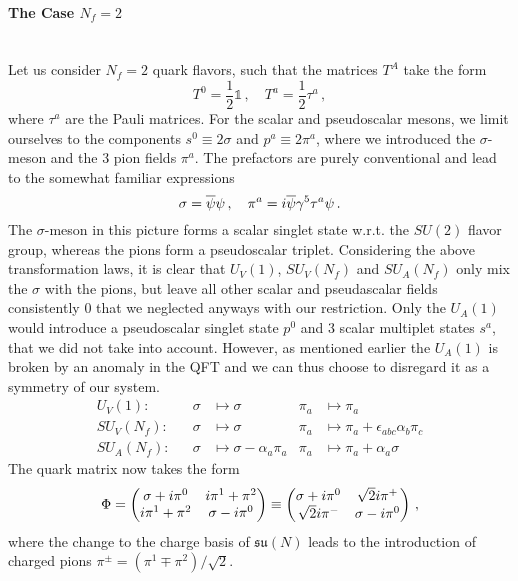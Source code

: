 \paragraph{The Case $N_f=2$}\mbox{}\\

Let us consider $N_f=2$ quark flavors, such that the matrices $T^A$ take the form
\begin{equation}
    T^0=\frac{1}{2}\mathbb{1}\,,\quad T^a=\frac{1}{2}\tau^a\,,
\end{equation}
where $\tau^a$ are the Pauli matrices. For the scalar and pseudoscalar mesons, we limit ourselves to the components $s^0\equiv 2\sigma$ and $p^a\equiv 2\pi^a$, where we introduced the $\sigma$-meson and the 3 pion fields $\pi^a$. The prefactors are purely conventional and lead to the somewhat familiar expressions
\begin{equation}
    \sigma=\overline{\psi}\psi\,,\quad \pi^a={i}\overline{\psi}\gamma^5\tau^a\psi\,.
\end{equation}
The $\sigma$-meson in this picture forms a scalar singlet state w.r.t. the $SU(2)$ flavor group, whereas the pions form a pseudoscalar triplet. Considering the above transformation laws, it is clear that $U_V(1)$, $SU_V(N_f)$ and $SU_A(N_f)$ only mix the $\sigma$ with the pions, but leave all other scalar and pseudascalar fields consistently $0$ that we neglected anyways with our restriction. Only the $U_A(1)$ would introduce a pseudoscalar singlet state $p^0$ and 3 scalar multiplet states $s^a$, that we did not take into account. However, as mentioned earlier the $U_A(1)$ is broken by an anomaly in the QFT and we can thus choose to disregard it as a symmetry of our system.
\begin{subequations}
    \begin{align}
        &  & U_V(1): &  & \sigma & \mapsto\sigma               & \pi_a            & \mapsto\pi_a & & \\
        &  & SU_V(N_f): &  & \sigma & \mapsto\sigma               & \pi_a            & \mapsto\pi_a+\epsilon_{abc}\alpha_b\pi_c                                                    & & \\
        &  & SU_A(N_f): &  & \sigma & \mapsto\sigma-\alpha_a\pi_a & \pi_a            & \mapsto\pi_a+\alpha_a\sigma                                                                 & & 
    \end{align}
\end{subequations}
The quark matrix now takes the form
\begin{equation}
    \Phi=\begin{pmatrix}
        \sigma+{i}\pi^0&{i}\pi^1+\pi^2\\
        {i}\pi^1+\pi^2&\sigma-{i}\pi^0
    \end{pmatrix}\equiv
    \begin{pmatrix}
        \sigma+{i}\pi^0&\sqrt{2}{i}\pi^+\\
        \sqrt{2}{i}\pi^-&\sigma-{i}\pi^0
    \end{pmatrix}\,,
\end{equation}
where the change to the charge basis of $\mathfrak{su}(N)$ leads to the introduction of charged pions ${\pi^\pm=(\pi^1\mp\pi^2)/\sqrt{2}}$.

